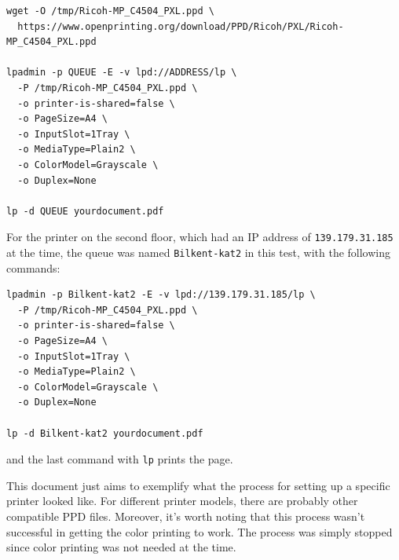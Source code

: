 \documentclass[10pt]{article}
\begin{document}
\vspace{6 px}

\begin{Verbatim}
wget -O /tmp/Ricoh-MP_C4504_PXL.ppd \
  https://www.openprinting.org/download/PPD/Ricoh/PXL/Ricoh-MP_C4504_PXL.ppd

lpadmin -p QUEUE -E -v lpd://ADDRESS/lp \
  -P /tmp/Ricoh-MP_C4504_PXL.ppd \
  -o printer-is-shared=false \
  -o PageSize=A4 \
  -o InputSlot=1Tray \
  -o MediaType=Plain2 \
  -o ColorModel=Grayscale \
  -o Duplex=None

lp -d QUEUE yourdocument.pdf
\end{Verbatim}

\vspace{12 px}

For the printer on the second floor, which had an IP address of \texttt{139.179.31.185} at the time, the queue was named \texttt{Bilkent-kat2} in this test, with the following commands:

\vspace{6 px}

\begin{Verbatim}
lpadmin -p Bilkent-kat2 -E -v lpd://139.179.31.185/lp \
  -P /tmp/Ricoh-MP_C4504_PXL.ppd \
  -o printer-is-shared=false \
  -o PageSize=A4 \
  -o InputSlot=1Tray \
  -o MediaType=Plain2 \
  -o ColorModel=Grayscale \
  -o Duplex=None

lp -d Bilkent-kat2 yourdocument.pdf
\end{Verbatim}

\vspace{6 px}

and the last command with \texttt{lp} prints the page.

\vspace{12 px}

This document just aims to exemplify what the process for setting up a specific printer looked like. For different printer models, there are probably other compatible PPD files. Moreover, it's worth noting that this process wasn't successful in getting the color printing to work. The process was simply stopped since color printing was not needed at the time. 
\end{document}
